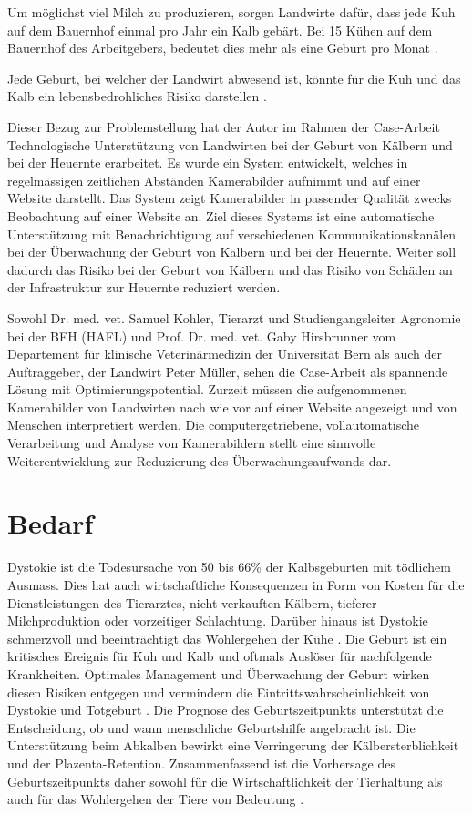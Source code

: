 Um möglichst viel Milch zu produzieren, sorgen Landwirte dafür, dass jede Kuh auf dem Bauernhof einmal pro Jahr ein Kalb gebärt. Bei 15 Kühen auf dem Bauernhof des Arbeitgebers, bedeutet dies mehr als eine Geburt pro Monat \citep{Muller2019}.

Jede Geburt, bei welcher der Landwirt abwesend ist, könnte  für die Kuh und das Kalb ein lebensbedrohliches Risiko darstellen \citep{Muller2019}. 

Dieser Bezug zur Problemstellung hat der Autor im Rahmen der Case-Arbeit \flqq{}Technologische Unterstützung von Landwirten bei der Geburt von Kälbern und bei der Heuernte\frqq{} erarbeitet. Es wurde ein System entwickelt, welches in regelmässigen zeitlichen Abständen Kamerabilder aufnimmt und auf einer Website darstellt. Das System zeigt Kamerabilder in passender Qualität zwecks Beobachtung auf einer Website an. Ziel dieses Systems ist eine automatische Unterstützung mit Benachrichtigung auf verschiedenen Kommunikationskanälen bei der Überwachung der Geburt von Kälbern und bei der Heuernte. Weiter soll dadurch das Risiko bei der Geburt von Kälbern und das Risiko von Schäden an der Infrastruktur zur Heuernte reduziert werden.

Sowohl Dr. med. vet. Samuel Kohler, Tierarzt und Studiengangsleiter Agronomie bei der BFH (HAFL) und Prof. Dr. med. vet. Gaby Hirsbrunner vom Departement für klinische Veterinärmedizin der Universität Bern als auch der Auftraggeber, der Landwirt Peter Müller, sehen die Case-Arbeit als spannende Lösung mit Optimierungspotential. Zurzeit müssen die aufgenommenen Kamerabilder von Landwirten nach wie vor auf einer Website angezeigt und von Menschen interpretiert werden. Die computergetriebene, vollautomatische Verarbeitung und Analyse von Kamerabildern stellt eine sinnvolle Weiterentwicklung zur Reduzierung des Überwachungsaufwands dar. 

\section{Bedarf}

Dystokie ist die Todesursache von 50 bis 66\% der Kalbsgeburten mit tödlichem Ausmass. Dies hat auch wirtschaftliche Konsequenzen in Form von Kosten für die Dienstleistungen des Tierarztes, nicht verkauften Kälbern, tieferer Milchproduktion oder vorzeitiger Schlachtung. Darüber hinaus ist Dystokie schmerzvoll und beeinträchtigt das Wohlergehen der Kühe \citep[S. 1]{Saint-Dizier2015}. Die Geburt ist ein kritisches Ereignis für Kuh und Kalb und oftmals Auslöser für nachfolgende Krankheiten. Optimales Management und Überwachung der Geburt wirken diesen Risiken entgegen und vermindern die Eintrittswahrscheinlichkeit von Dystokie und Totgeburt \citep[S. 1]{Lange2017}. Die Prognose des Geburtszeitpunkts unterstützt die Entscheidung, ob und wann menschliche Geburtshilfe angebracht ist. Die Unterstützung beim Abkalben bewirkt eine Verringerung der Kälbersterblichkeit und der Plazenta-Retention. Zusammenfassend ist die Vorhersage des Geburtszeitpunkts daher sowohl für die Wirtschaftlichkeit der Tierhaltung als auch für das Wohlergehen der Tiere von Bedeutung \citep[S. 1]{Saint-Dizier2015}.  


